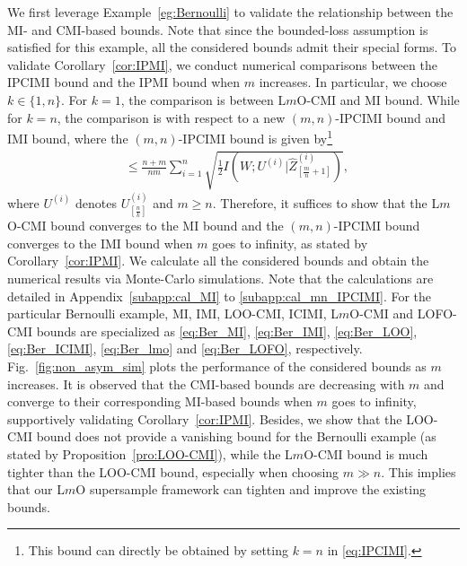 \documentclass[onecolumn,romanappendices,10pt]{IEEEtran}
\DeclareMathOperator{\gen}{\overline{gen}}
\begin{document}
	We first leverage Example~\ref{eg:Bernoulli} to validate the relationship between the MI- and CMI-based bounds. Note that since the bounded-loss assumption is satisfied for this example, all the considered bounds admit their special forms. To validate Corollary~\ref{cor:IPMI}, we conduct numerical comparisons between the IPCIMI bound and the IPMI bound when $m$ increases. In particular, we choose $k \in \{1, n\}$. For $k=1$, the comparison is between L$m$O-CMI and MI bound. While for $k=n$, the comparison is with respect to a new $(m, n)$-IPCIMI bound and IMI bound, where the $(m, n)$-IPCIMI bound is given by\footnote{This bound can directly be obtained by setting $k = n$ in \eqref{eq:IPCIMI}.}
	\begin{equation}\label{eq:m_n_IPCIMI}
		\begin{aligned}
			\gen \leq \frac{n+m}{nm} \sum_{i=1}^{n} \sqrt{ \frac{1}{2} I\left( W; U^{(i)} | \hat{Z}^{(i)}_{[\frac{m}{n} + 1]} \right)},
		\end{aligned}
	\end{equation}
	where $U^{(i)}$ denotes $U^{(i)}_{[\frac{n}{k}]}$ and $m \geq n$. Therefore, it suffices to show that the L$m$O-CMI bound converges to the MI bound and the $(m, n)$-IPCIMI bound converges to the IMI bound when $m$ goes to infinity, as stated by Corollary~\ref{cor:IPMI}. We calculate all the considered bounds and obtain the numerical results via Monte-Carlo simulations. Note that the calculations are detailed in Appendix~\ref{subapp:cal_MI} to \ref{subapp:cal_mn_IPCIMI}. For the particular Bernoulli example, MI, IMI, LOO-CMI, ICIMI, L$m$O-CMI and LOFO-CMI bounds are specialized as \eqref{eq:Ber_MI}, \eqref{eq:Ber_IMI}, \eqref{eq:Ber_LOO}, \eqref{eq:Ber_ICIMI}, \eqref{eq:Ber_lmo} and \eqref{eq:Ber_LOFO}, respectively. Fig.~\ref{fig:non_asym_sim} plots the performance of the considered bounds as $m$ increases. It is observed that the CMI-based bounds are decreasing with $m$ and converge to their corresponding MI-based bounds when $m$ goes to infinity, supportively validating Corollary~\ref{cor:IPMI}. Besides, we show that the LOO-CMI bound does not provide a vanishing bound for the Bernoulli example (as stated by Proposition~\ref{pro:LOO-CMI}), while the L$m$O-CMI bound is much tighter than the LOO-CMI bound, especially when choosing $m \gg n$. This implies that our L$m$O supersample framework can tighten and improve the existing bounds.
	
	
\end{document}
